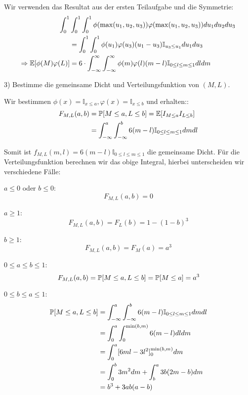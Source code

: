Wir verwenden das Resultat aus der ersten Teilaufgabe und die Symmetrie:
\begin{align*}
	\int_0^1 & \int_0^1 \int_0^1 \phi(\max(u_1, u_2, u_3)) \varphi(\max(u_1, u_2, u_3)) du_1 du_2 du_3 \\
	&= \int_0^1 \int_0^1 \phi(u_1) \varphi(u_3) (u_1 - u_3) \mathbb I_{u_3 \leq u_1} du_1 du_3 \\
	\Rightarrow \mathbb{E}[\phi(M) \varphi(L)] &= 6 \cdot \int_{-\infty}^\infty \int_{-\infty}^\infty \phi(m) \varphi(l) (m-l) \mathbb I_{0 \leq l \leq m \leq 1} dldm
\end{align*}

3) Bestimme die gemeinsame Dicht und Verteilungsfunktion von $(M, L)$.

Wir bestimmen $\phi(x) = \mathbb I_{x \leq a}, \varphi(x) = \mathbb I_{x \leq b}$ und erhalten::
\begin{align*}
	F_{M,L}(a,b) &= \mathbb{P}[M \leq a, L \leq b] = \mathbb{E}[I_{M \leq a} I_{L \leq b}] \\
	&= \int_{-\infty}^a \int_{-\infty}^b 6(m-l) \mathbb I_{0 \leq l \leq m \leq 1} dmdl
\end{align*}

Somit ist $f_{M,L}(m,l) = 6(m-l) \mathbb I_{0 \leq l \leq m \leq 1}$ die gemeinsame Dicht. Für die Verteilungsfunktion berechnen wir das obige Integral, hierbei unterscheiden wir verschiedene Fälle:

$a \leq 0$ oder $b \leq 0$:
$$F_{M,L}(a,b) = 0$$

$a \geq 1$:
$$F_{M,L}(a,b) = F_L(b) = 1 - (1-b)^3$$

$b \geq 1$:
$$F_{M,L}(a,b) = F_M(a) = a^3$$

$0 \leq a \leq b \leq 1$:
$$F_{M,L}(a,b) = \mathbb{P}[M \leq a, L \leq b] = \mathbb{P}[M \leq a] = a^3$$

$0 \leq b \leq a \leq 1$:
\begin{align*}
	\mathbb{P}[M \leq a, L \leq b] &= \int_{-\infty}^a \int_{-\infty}^b 6(m-l) \mathbb I_{0 \leq l \leq m \leq 1} dmdl \\
	&= \int_0^a \int_0^{\min(b, m)} 6(m-l) dldm \\
	&= \int_0^a [6ml - 3l^2]_0^{\min(b, m)} dm \\
	&= \int_0^b 3m^2 dm + \int_b^a 3b(2m - b) dm \\
	&= b^3 + 3ab(a-b)
\end{align*}

\hrulefill